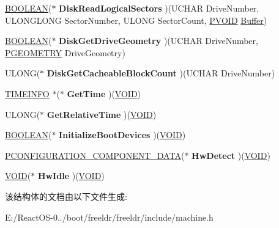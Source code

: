 \begin{DoxyCompactItemize}
\hyperlink{_processor_bind_8h_a112e3146cb38b6ee95e64d85842e380a}{B\+O\+O\+L\+E\+AN}($\ast$ {\bfseries Disk\+Read\+Logical\+Sectors} )(U\+C\+H\+AR Drive\+Number, U\+L\+O\+N\+G\+L\+O\+NG Sector\+Number, U\+L\+O\+NG Sector\+Count, \hyperlink{interfacevoid}{P\+V\+O\+ID} \hyperlink{class_buffer}{Buffer})
\item 
\mbox{\label{structtag_m_a_c_h_v_t_b_l_a6c048b5072c22de6577421a0d15d7eac}} 
\hyperlink{_processor_bind_8h_a112e3146cb38b6ee95e64d85842e380a}{B\+O\+O\+L\+E\+AN}($\ast$ {\bfseries Disk\+Get\+Drive\+Geometry} )(U\+C\+H\+AR Drive\+Number, \hyperlink{struct___g_e_o_m_e_t_r_y}{P\+G\+E\+O\+M\+E\+T\+RY} Drive\+Geometry)
\item 
\mbox{\label{structtag_m_a_c_h_v_t_b_l_a982071d1f70781d668ec385f7503e757}} 
U\+L\+O\+NG($\ast$ {\bfseries Disk\+Get\+Cacheable\+Block\+Count} )(U\+C\+H\+AR Drive\+Number)
\item 
\mbox{\label{structtag_m_a_c_h_v_t_b_l_a57d5d6fdadd5680b627d4796b5b595c3}} 
\hyperlink{struct___t_i_m_e_i_n_f_o}{T\+I\+M\+E\+I\+N\+FO} $\ast$($\ast$ {\bfseries Get\+Time} )(\hyperlink{interfacevoid}{V\+O\+ID})
\item 
\mbox{\label{structtag_m_a_c_h_v_t_b_l_aa72f6462b02e10c69e7c2ced04077650}} 
U\+L\+O\+NG($\ast$ {\bfseries Get\+Relative\+Time} )(\hyperlink{interfacevoid}{V\+O\+ID})
\item 
\mbox{\label{structtag_m_a_c_h_v_t_b_l_a38271b419af591b0e025dacf7e84699e}} 
\hyperlink{_processor_bind_8h_a112e3146cb38b6ee95e64d85842e380a}{B\+O\+O\+L\+E\+AN}($\ast$ {\bfseries Initialize\+Boot\+Devices} )(\hyperlink{interfacevoid}{V\+O\+ID})
\item 
\mbox{\label{structtag_m_a_c_h_v_t_b_l_a793682396db686d6c3612b4c524accf9}} 
\hyperlink{struct___c_o_n_f_i_g_u_r_a_t_i_o_n___c_o_m_p_o_n_e_n_t___d_a_t_a}{P\+C\+O\+N\+F\+I\+G\+U\+R\+A\+T\+I\+O\+N\+\_\+\+C\+O\+M\+P\+O\+N\+E\+N\+T\+\_\+\+D\+A\+TA}($\ast$ {\bfseries Hw\+Detect} )(\hyperlink{interfacevoid}{V\+O\+ID})
\item 
\mbox{\label{structtag_m_a_c_h_v_t_b_l_ab3f14ab534d88071414dcc6ac779b123}} 
\hyperlink{interfacevoid}{V\+O\+ID}($\ast$ {\bfseries Hw\+Idle} )(\hyperlink{interfacevoid}{V\+O\+ID})
\end{DoxyCompactItemize}


该结构体的文档由以下文件生成\+:\begin{DoxyCompactItemize}
\item 
E\+:/\+React\+O\+S-\/0../boot/freeldr/freeldr/include/machine.\+h\end{DoxyCompactItemize}
